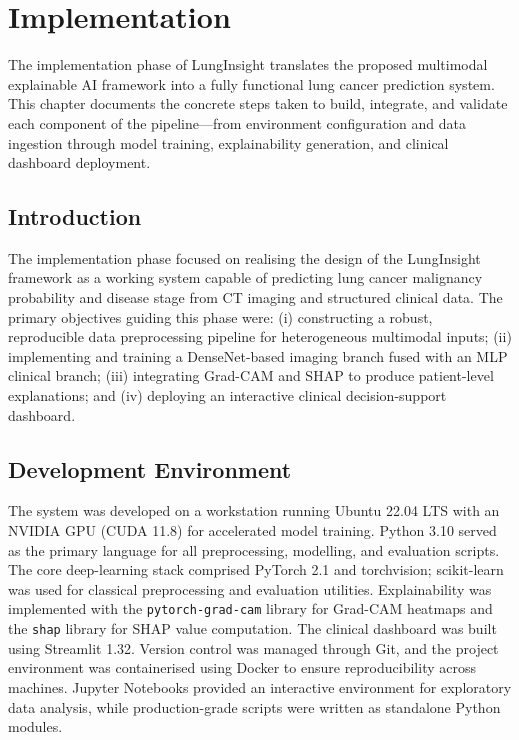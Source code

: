 \chapter{Implementation}\thispagestyle{empty} %
\graphicspath{{Chapter4/figures/}}
{


The implementation phase of LungInsight translates the proposed multimodal explainable AI
framework into a fully functional lung cancer prediction system. This chapter documents the
concrete steps taken to build, integrate, and validate each component of the pipeline—from
environment configuration and data ingestion through model training, explainability generation,
and clinical dashboard deployment.

\section{Introduction}

The implementation phase focused on realising the design of the LungInsight framework as a
working system capable of predicting lung cancer malignancy probability and disease stage from
CT imaging and structured clinical data. The primary objectives guiding this phase were: (i)
constructing a robust, reproducible data preprocessing pipeline for heterogeneous multimodal
inputs; (ii) implementing and training a DenseNet-based imaging branch fused with an MLP
clinical branch; (iii) integrating Grad-CAM and SHAP to produce patient-level explanations; and
(iv) deploying an interactive clinical decision-support dashboard.

\section{Development Environment}

The system was developed on a workstation running Ubuntu 22.04 LTS with an NVIDIA GPU
(CUDA 11.8) for accelerated model training. Python 3.10 served as the primary language for
all preprocessing, modelling, and evaluation scripts. The core deep-learning stack comprised
PyTorch 2.1 and torchvision; scikit-learn was used for classical preprocessing and evaluation
utilities. Explainability was implemented with the \texttt{pytorch-grad-cam} library for
Grad-CAM heatmaps and the \texttt{shap} library for SHAP value computation. The clinical
dashboard was built using Streamlit 1.32. Version control was managed through Git, and the
project environment was containerised using Docker to ensure reproducibility across machines.
Jupyter Notebooks provided an interactive environment for exploratory data analysis, while
production-grade scripts were written as standalone Python modules.

}
